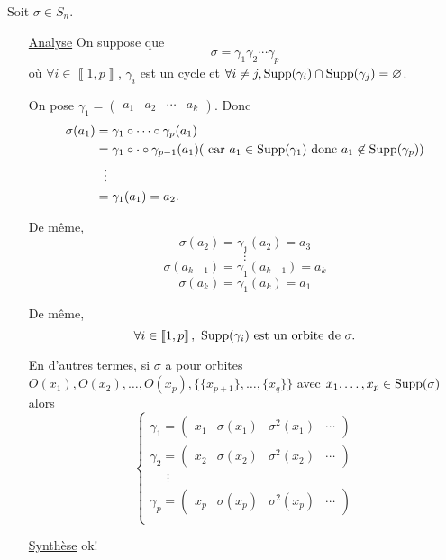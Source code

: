 \begin{prv}
	Soit $\sigma \in S_n$.

	\begin{itemize}
		\item[\underline{\sc Analyse}] On suppose que \[
				\sigma = \gamma_1 \gamma_2 \cdots \gamma_p
			\] où $\forall i \in \left\llbracket 1,p \right\rrbracket$, $\gamma_i$ est un cycle et $\forall i \neq j, \operatorname{Supp}(\gamma_i)\cap \operatorname{Supp}(\gamma_j) = \varnothing$.

			On pose $\gamma_1 = \begin{pmatrix}
				a_1&a_2&\cdots&a_k
			\end{pmatrix}$. Donc
			\begin{align*}
				\sigma(a_1) &= \gamma_1 \circ \cdots \circ \gamma_p(a_1)\\
				&= \gamma_1  \circ \cdot  \circ \gamma_{p-1}(a_1) (\text{ car } a_1 \in \operatorname{Supp}(\gamma_1) \text{ donc } a_1\not\in \operatorname{Supp}(\gamma_p))\\
				&~~\vdots \\
				&= \gamma_1(a_1) = a_2. \\
			\end{align*}

			De même,
			\[ \sigma(a_2) = \gamma_1(a_2) = a_3 \]
			\[\vdots\]
			\[ \sigma(a_{k-1}) = \gamma_1(a_{k-1}) = a_k \]
			\[ \sigma(a_k) = \gamma_1(a_k) = a_1 \]

			De même, \[
				\forall i \in \left\llbracket 1,p \right\rrbracket,~\operatorname{Supp}(\gamma_i) \text{ est un orbite de } \sigma.
			\]

			En d'autres termes, si $\sigma$ a pour orbites $O(x_1), O(x_2), \ldots, O(x_p), \{\{x_{p+1}\},\ldots, \{x_q\}\}$ avec $x_1, \ldots, x_p \in \operatorname{Supp}(\sigma)$ alors \[
				\begin{cases}
					\gamma_1 = \begin{pmatrix} x_1&\sigma(x_1)&\sigma^2(x_1)&\cdots \end{pmatrix} \\
					\gamma_2 = \begin{pmatrix} x_2&\sigma(x_2)&\sigma^2(x_2)&\cdots \end{pmatrix}\\
					~~~~~~\vdots\\
					\gamma_p = \begin{pmatrix} x_p&\sigma(x_p)&\sigma^2(x_p)&\cdots \end{pmatrix} \\
				\end{cases}
			\]
		\item[\underline{\sc Synthèse}] ok!
	\end{itemize}
\end{prv}

